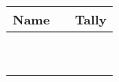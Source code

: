 \begin{tabularx}{\textwidth}{lr|X}
\toprule
\sc Name & \sc\phantom{Balance} &\sc Tally\\\toprule
\phantom{William Mountbatten}&&\\\midrule
&&\\\midrule
&&\\\midrule
&&\\\midrule
&&\\\midrule
&&\\\midrule
&&\\\midrule
&&\\\midrule
\arrayrulecolor{black}\bottomrule
\end{tabularx}
